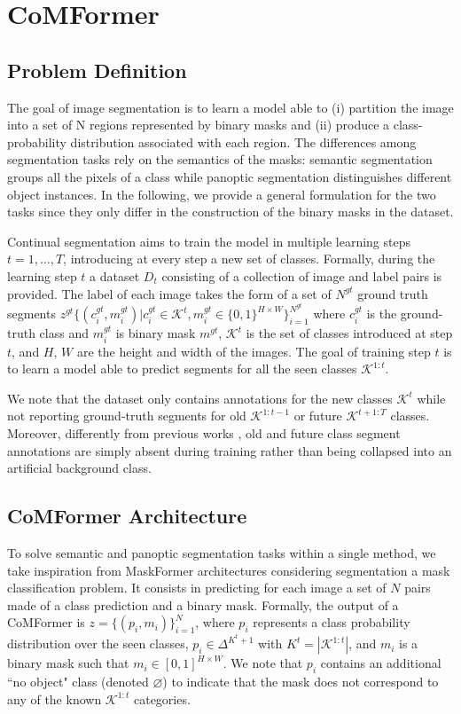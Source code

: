\documentclass[10pt,twocolumn,letterpaper]{article}
\begin{document}
\section{CoMFormer}
\label{sec:method}
\subsection{Problem Definition} \label{sec:setting}
The goal of image segmentation is to learn a model able to (i) partition the image into a set of N regions represented by binary masks and (ii) produce a class-probability distribution associated with each region. The differences among segmentation tasks rely on the semantics of the masks: semantic segmentation groups all the pixels of a class while panoptic segmentation distinguishes different object instances. In the following, we provide a general formulation for the two tasks since they only differ in the construction of the binary masks in the dataset.

Continual segmentation aims to train the model in multiple learning steps $t = 1, \dots, T$, introducing at every step a new set of classes.
Formally, during the learning step $t$ a dataset $D_t$ consisting of a collection of image and label pairs is provided.
The label of each image takes the form of a set of $N^{gt}$ ground truth segments $z^{gt}\{(c_i^{gt}, m_i^{gt})|c_i^{gt} \in \mathcal{K}^t, m_i^{gt} \in \{0,1\}^{H \times W} \}_{i=1}^{N^{gt}}$ where $c_i^{gt}$ is the ground-truth class and $m_i^{gt}$ is binary mask $m^{gt}$, $\mathcal{K}^t$ is the set of classes introduced at step $t$, and $H$, $W$ are the height and width of the images. The goal of training step $t$ is to learn a model able to predict segments for all the seen classes $\mathcal{K}^{1:t}$.

We note that the dataset only contains annotations for the new classes $\mathcal{K}^t$ while not reporting ground-truth segments for old $\mathcal{K}^{1:t-1}$ or future $\mathcal{K}^{t+1:T}$ classes. 
Moreover, differently from previous works \cite{cermelli2020modelingthebackground}, old and future class segment annotations are simply absent during training rather than being collapsed into an artificial background class. 

\subsection{CoMFormer Architecture}
To solve semantic and panoptic segmentation tasks within a single method, we take inspiration from MaskFormer architectures \cite{cheng2021maskformer, cheng2021masked} considering segmentation a mask classification problem. It consists in predicting for each image a set of $N$ pairs made of a class prediction and a binary mask.
Formally, the output of a CoMFormer is $z = \{(p_i, m_i)\}_{i=1}^{N}$, where $p_i$ represents a class probability distribution over the seen classes, \ie $p_i \in \Delta^{K^t+1}$ with $K^t = |\mathcal{K}^{1:t}|$, and $m_i$ is a binary mask such that $m_i \in [0,1]^{H \times W}$. We note that $p_i$ contains an additional “no object" class (denoted $\varnothing$) to indicate that the mask does not correspond to any of the known $\mathcal{K}^{1:t}$ categories.
\end{document}
